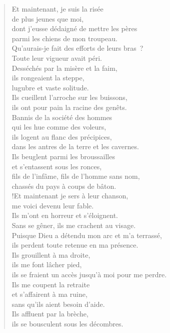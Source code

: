 \documentclass[french,twoside]{book} %
\begin{document}
\begin{verse}
Et maintenant, je suis la risée \\
de plus jeunes que moi, \\
dont j’eusse dédaigné de mettre les pères \\
parmi les chiens de mon troupeau.\\
Qu’aurais-je fait des efforts de leurs bras ? \\
Toute leur vigueur avait péri.\\
Desséchés par la misère et la faim, \\
ils rongeaient la steppe, \\
lugubre et vaste solitude.\\
Ils cueillent l’arroche sur les buissons, \\
ils ont pour pain la racine des genêts.\\
Bannis de la société des hommes \\
qui les hue comme des voleurs,\\
ils logent au flanc des précipices, \\
dans les antres de la terre et les cavernes.\\
Ils beuglent parmi les broussailles \\
et s’entassent sous les ronces,\\
fils de l’infâme, fils de l’homme sans nom, \\
chassés du pays à coups de bâton.\\!Et maintenant je sers à leur chanson, \\
me voici devenu leur fable.\\
Ils m’ont en horreur et s’éloignent. \\
Sans se gêner, ils me crachent au visage.\\
Puisque Dieu a détendu mon arc et m’a terrassé, \\
ils perdent toute retenue en ma présence.\\
Ils grouillent à ma droite, \\
ils me font lâcher pied, \\
ils se fraient un accès jusqu’à moi pour me perdre.\\
Ils me coupent la retraite \\
et s’affairent à ma ruine, \\
sans qu’ils aient besoin d’aide.\\
Ils affluent par la brèche, \\
ils se bousculent sous les décombres.\\

\end{verse}
\end{document}
